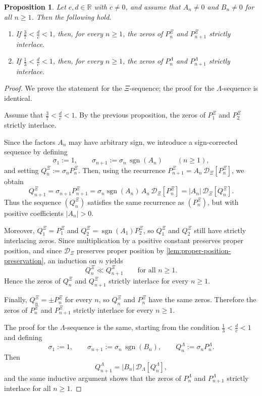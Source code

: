 \documentclass[11pt,twoside]{article}
\newtheorem{proposition}[theorem]{Proposition}
\numberwithin{equation}{section}
\begin{document}
\begin{proposition}
Let \(c,d\in\mathbb R\) with \(c\neq 0\), and assume that \(A_n\neq 0\) and \(B_n\neq 0\) for all \(n\ge1\). Then the following hold.
\begin{enumerate}
\item If \(\frac37<\frac dc<1\), then, for every \(n\ge1\), the zeros of \(P_n^\Xi\) and \(P_{n+1}^\Xi\) strictly interlace.

\item If \(\frac13<\frac dc<1\), then, for every \(n\ge1\), the zeros of \(P_n^\Lambda\) and \(P_{n+1}^\Lambda\) strictly interlace.
\end{enumerate}
\end{proposition}

\begin{proof}
We prove the statement for the \(\Xi\)-sequence; the proof for the \(\Lambda\)-sequence is identical.

Assume that \(\frac37<\frac dc<1\). By the previous proposition, the zeros of \(P_1^\Xi\) and \(P_2^\Xi\) strictly interlace.

Since the factors \(A_n\) may have arbitrary sign, we introduce a sign-corrected sequence by defining
\[
\sigma_1:=1,
\qquad
\sigma_{n+1}:=\sigma_n\,\operatorname{sgn}(A_n)
\qquad (n\ge1),
\]
and setting \(Q_n^\Xi:=\sigma_n P_n^\Xi\). Then, using the recurrence \(P_{n+1}^\Xi=A_n\,\mathcal D_\Xi[P_n^\Xi]\), we obtain
\[
Q_{n+1}^\Xi
=
\sigma_{n+1}P_{n+1}^\Xi
=
\sigma_n\operatorname{sgn}(A_n)\,A_n\,\mathcal D_\Xi[P_n^\Xi]
=
|A_n|\,\mathcal D_\Xi[Q_n^\Xi].
\]
Thus the sequence \((Q_n^\Xi)\) satisfies the same recurrence as \((P_n^\Xi)\), but with positive coefficients \(|A_n|>0\).

Moreover, \(Q_1^\Xi=P_1^\Xi\) and \(Q_2^\Xi=\operatorname{sgn}(A_1)P_2^\Xi\), so \(Q_1^\Xi\) and \(Q_2^\Xi\) still have strictly interlacing zeros. Since multiplication by a positive constant preserves proper position, and since \(\mathcal D_\Xi\) preserves proper position by \cref{lem:proper-position-preservation}, an induction on \(n\) yields
\[
Q_n^\Xi \ll Q_{n+1}^\Xi
\qquad\text{for all } n\ge1.
\]
Hence the zeros of \(Q_n^\Xi\) and \(Q_{n+1}^\Xi\) strictly interlace for every \(n\ge1\).

Finally, \(Q_n^\Xi=\pm P_n^\Xi\) for every \(n\), so \(Q_n^\Xi\) and \(P_n^\Xi\) have the same zeros. Therefore the zeros of \(P_n^\Xi\) and \(P_{n+1}^\Xi\) strictly interlace for every \(n\ge1\).

The proof for the \(\Lambda\)-sequence is the same, starting from the condition \(\frac13<\frac dc<1\) and defining
\[
\sigma_1:=1,
\qquad
\sigma_{n+1}:=\sigma_n\,\operatorname{sgn}(B_n),
\qquad
Q_n^\Lambda:=\sigma_n P_n^\Lambda.
\]
Then
\[
Q_{n+1}^\Lambda=|B_n|\,\mathcal D_\Lambda[Q_n^\Lambda],
\]
and the same inductive argument shows that the zeros of \(P_n^\Lambda\) and \(P_{n+1}^\Lambda\) strictly interlace for all \(n\ge1\).
\end{proof}
\end{document}
